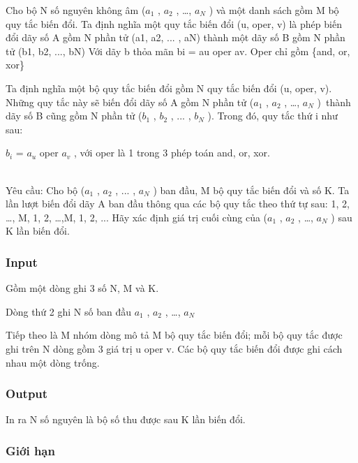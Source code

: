 





   Cho bộ N số nguyên không âm ($a_{1}$   , $a_{2}$   , …, $a_{N}$   ) và một danh sách gồm M bộ quy tắc biến đổi.       Ta định nghĩa một quy tắc biến đổi (u, oper, v) là phép biến đổi dãy số A gồm N phần tử (a1, a2, ... , aN) thành một dãy số B gồm N phần tử (b1, b2, ..., bN)       Với dãy b thỏa mãn       bi = au oper av. Oper chỉ gồm \{and, or, xor\}    

   Ta định nghĩa một bộ quy tắc biến đổi gồm N quy tắc biến đổi (u, oper, v). Những quy tắc này sẽ biến đổi dãy số A gồm N phần tử ($a_{1}$   , $a_{2}$   , …, $a_{N}$   ) thành dãy số B cũng gồm N phần tử ($b_{1}$   , $b_{2}$   , ... , $b_{N}$   ). Trong đó, quy tắc thứ i như sau:  

   $b_{i}$   = $a_{u}$   oper $a_{v}$   , với oper là 1 trong 3 phép toán and, or, xor.  


\\   Yêu cầu: Cho bộ ($a_{1}$   , $a_{2}$   , ... , $a_{N}$   ) ban đầu, M bộ quy tắc biến đổi và số K. Ta lần lượt biến đổi dãy A ban đầu thông qua các bộ quy tắc theo thứ tự sau: 1, 2, …, M, 1, 2, …,M, 1, 2, ... Hãy xác định giá trị cuối cùng của ($a_{1}$   , $a_{2}$   , …, $a_{N}$   ) sau K lần biến đổi.  

\subsubsection{   Input  }



   Gồm một dòng ghi 3 số N, M và K.  

   Dòng thứ 2 ghi N số ban đầu $a_{1}$   , $a_{2}$   , …, $a_{N}$

    Tiếp theo là M nhóm dòng mô tả M bộ quy tắc biến đổi; mỗi bộ quy tắc được ghi trên N dòng gồm 3 giá trị u oper v. Các bộ quy tắc biến đổi được ghi cách nhau một dòng trống.   

\subsubsection{   Output  }

     In ra N số nguyên là bộ số thu được sau K lần biến đổi.    

\subsubsection{     Giới hạn    }



